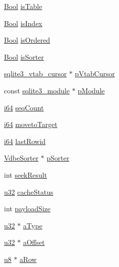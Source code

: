 \begin{DoxyCompactItemize}
\hyperlink{sqlite3_8c_a253b248072cfc8bd812c69acd0046eed}{Bool} \hyperlink{struct_vdbe_cursor_a2c9ae9907e6649324d65d8cbd889806e}{is\-Table}
\item 
\hyperlink{sqlite3_8c_a253b248072cfc8bd812c69acd0046eed}{Bool} \hyperlink{struct_vdbe_cursor_a60a947acdb24b640fe0ff6112d0ae104}{is\-Index}
\item 
\hyperlink{sqlite3_8c_a253b248072cfc8bd812c69acd0046eed}{Bool} \hyperlink{struct_vdbe_cursor_a8d9e802372b801c4eb5aef6340cfa21a}{is\-Ordered}
\item 
\hyperlink{sqlite3_8c_a253b248072cfc8bd812c69acd0046eed}{Bool} \hyperlink{struct_vdbe_cursor_a1bb8b53ff5eb06047c38da9e7306395b}{is\-Sorter}
\item 
\hyperlink{structsqlite3__vtab__cursor}{sqlite3\-\_\-vtab\-\_\-cursor} $\ast$ \hyperlink{struct_vdbe_cursor_a2f58fca4f47a313a461f40a0ac553bf5}{p\-Vtab\-Cursor}
\item 
const \hyperlink{structsqlite3__module}{sqlite3\-\_\-module} $\ast$ \hyperlink{struct_vdbe_cursor_ab385a7fa060ff00bbe9e6861bb599505}{p\-Module}
\item 
\hyperlink{sqlite3_8c_a2a0f0f4ae7001eb54351f77ea1cdbcfd}{i64} \hyperlink{struct_vdbe_cursor_a4f11f0befb0dcf16273cc832ca6d92a5}{seq\-Count}
\item 
\hyperlink{sqlite3_8c_a2a0f0f4ae7001eb54351f77ea1cdbcfd}{i64} \hyperlink{struct_vdbe_cursor_af3c157d480c0597ba50aca227eb8e3b8}{moveto\-Target}
\item 
\hyperlink{sqlite3_8c_a2a0f0f4ae7001eb54351f77ea1cdbcfd}{i64} \hyperlink{struct_vdbe_cursor_af2ff971acc308c012c60b1e949c64411}{last\-Rowid}
\item 
\hyperlink{struct_vdbe_sorter}{Vdbe\-Sorter} $\ast$ \hyperlink{struct_vdbe_cursor_a7e9030a9f4ff8f8161a78dae28a1fe3b}{p\-Sorter}
\item 
int \hyperlink{struct_vdbe_cursor_a5eff86e2a9c87dc15956ad362aa03f05}{seek\-Result}
\item 
\hyperlink{sqlite3_8c_a03ad5adfaeb9b7640dde78a0cc390319}{u32} \hyperlink{struct_vdbe_cursor_acf243b5a94a6e5a11341d6fece473c00}{cache\-Status}
\item 
int \hyperlink{struct_vdbe_cursor_a5c1fa124d7f27a30e14ef0f455955cab}{payload\-Size}
\item 
\hyperlink{sqlite3_8c_a03ad5adfaeb9b7640dde78a0cc390319}{u32} $\ast$ \hyperlink{struct_vdbe_cursor_a6992d2bf9eb8480985aec47dae58f1ab}{a\-Type}
\item 
\hyperlink{sqlite3_8c_a03ad5adfaeb9b7640dde78a0cc390319}{u32} $\ast$ \hyperlink{struct_vdbe_cursor_a17431e67b341282aeb6c026cd01ec1e9}{a\-Offset}
\item 
\hyperlink{sqlite3_8c_a74a0f6424ae628af25f23f0a35f6ead3}{u8} $\ast$ \hyperlink{struct_vdbe_cursor_a6bd10979ffb5d4828967eea1d6e0d2c8}{a\-Row}
\end{DoxyCompactItemize}


